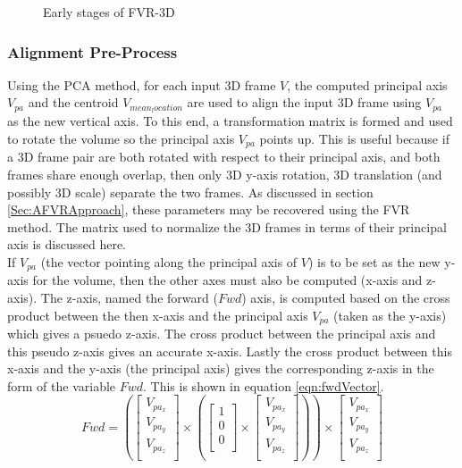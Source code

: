 \begin{figure}[!htb]
       \caption{Early stages of FVR-3D}
       \label{fig:FVR3D111}
\end{figure}



\subsubsection{Alignment Pre-Process}

Using the PCA method, for each input 3D frame $V$, the computed principal axis $V_{pa}$ and the centroid $V_{mean_location}$ are used to align the input 3D frame using $V_{pa}$ as the new vertical axis. To this end, a transformation matrix is formed and used to rotate the volume so the principal axis $V_{pa}$ points up. This is useful because if a 3D frame pair are both rotated with respect to their principal axis, and both frames share enough overlap, then only 3D y-axis rotation, 3D translation (and possibly 3D scale) separate the two frames. As discussed in section \ref{Sec:AFVRApproach}, these parameters may be recovered using the FVR method. The matrix used to normalize the 3D frames in terms of their principal axis is discussed here. \\

If $V_{pa}$ (the vector pointing along the principal axis of $V$) is to be set as the new y-axis for the volume, then the other axes must also be computed (x-axis and z-axis). The z-axis, named the forward ($Fwd$) axis, is computed based on the cross product between the then x-axis and the principal axis $V_{pa}$ (taken as the y-axis) which gives a psuedo z-axis. The cross product between the principal axis and this pseudo z-axis gives an accurate x-axis. Lastly the cross product between this x-axis and the y-axis (the principal axis) gives the corresponding z-axis in the form of the variable $Fwd$. This is shown in equation \ref{eqn:fwdVector}. \\


\begin{equation} \label{eqn:fwdVector}
Fwd = \left(\left[
\begin{array}{c}
V_{pa_{x}}\\
V_{pa_{y}}\\
V_{pa_{z}}\\
\end{array}
\right] \times \left(\left[
\begin{array}{c}
1\\
0\\
0\\
\end{array}
\right] \times \left[
\begin{array}{c}
V_{pa_{x}}\\
V_{pa_{y}}\\
V_{pa_{z}}\\
\end{array}
\right]\right)\right) \times \left[
\begin{array}{c}
V_{pa_{x}}\\
V_{pa_{y}}\\
V_{pa_{z}}\\
\end{array}
\right]
\end{equation}

